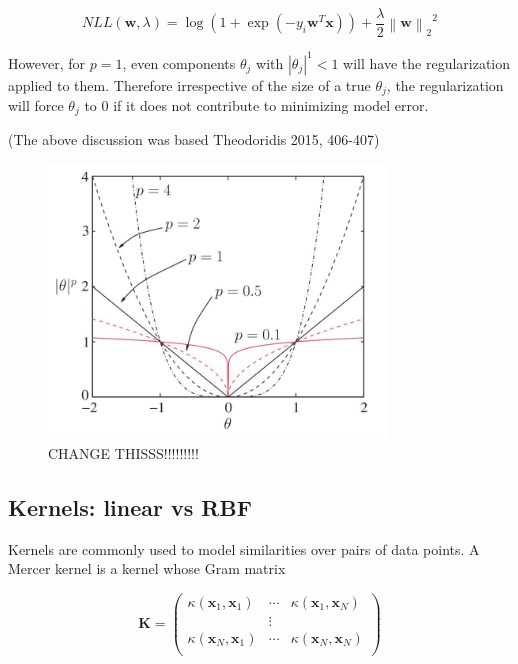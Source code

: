 \documentclass[letterpaper, 11pt]{article}
\newcommand{\norm}[1]{\left\lVert #1 \right\rVert}
\newcommand{\vect}[1]{\boldsymbol{#1}}
\begin{document}
\begin{equation*}
  NLL(\vect{w}, \lambda) = \log(1 + \exp(-y_i \vect{w}^T\vect{x})) + \frac{\lambda}{2} {\norm{\vect{w}}_2}^2
\end{equation*}

However, for $p = 1$, even components $\theta_j$ with $|\theta_j|^1 < 1$ will have the regularization applied to them. Therefore irrespective of the size of a true $\theta_j$, the regularization will force $\theta_j$ to 0 if it does not contribute to minimizing model error.

(The above discussion was based Theodoridis 2015, 406-407)

\begin{figure}[ht!]
\centering
\includegraphics[width=90mm]{figure1.jpg}
\caption{CHANGE THISSS!!!!!!!!! \label{overflow}}
\end{figure}

\subsection{Kernels: linear vs RBF}

Kernels are commonly used to model similarities over pairs of data points. A Mercer kernel is a kernel whose Gram matrix

\begin{equation*}
  \vect{K} = \begin{pmatrix}
    \kappa(\vect{x}_1, \vect{x}_1) & \cdots & \kappa(\vect{x}_1, \vect{x}_N) \\
    & \vdots & \\
    \kappa(\vect{x}_N, \vect{x}_1) & \cdots & \kappa(\vect{x}_N, \vect{x}_N) \\    
  \end{pmatrix}
\end{equation*}
\end{document}
